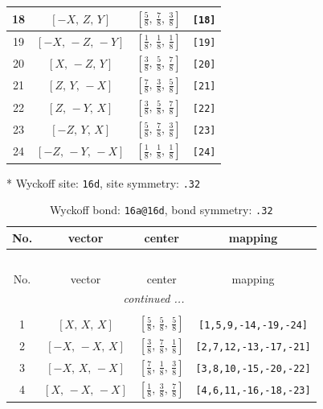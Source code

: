\documentclass[fleqn,8pt]{jsarticle}
\begin{document}
\begin{longtable}{cccc}
18 & $\left[ - X,\, Z,\, Y \right]$ & $\left[ \frac{5}{8},\, \frac{7}{8},\, \frac{3}{8} \right]$ & {\tt [18]} \\ \hline
19 & $\left[ - X,\, - Z,\, - Y \right]$ & $\left[ \frac{1}{8},\, \frac{1}{8},\, \frac{1}{8} \right]$ & {\tt [19]} \\ \hline
20 & $\left[ X,\, - Z,\, Y \right]$ & $\left[ \frac{3}{8},\, \frac{5}{8},\, \frac{7}{8} \right]$ & {\tt [20]} \\ \hline
21 & $\left[ Z,\, Y,\, - X \right]$ & $\left[ \frac{7}{8},\, \frac{3}{8},\, \frac{5}{8} \right]$ & {\tt [21]} \\ \hline
22 & $\left[ Z,\, - Y,\, X \right]$ & $\left[ \frac{3}{8},\, \frac{5}{8},\, \frac{7}{8} \right]$ & {\tt [22]} \\ \hline
23 & $\left[ - Z,\, Y,\, X \right]$ & $\left[ \frac{5}{8},\, \frac{7}{8},\, \frac{3}{8} \right]$ & {\tt [23]} \\ \hline
24 & $\left[ - Z,\, - Y,\, - X \right]$ & $\left[ \frac{1}{8},\, \frac{1}{8},\, \frac{1}{8} \right]$ & {\tt [24]} \\
\end{longtable}
* Wyckoff site: {\tt 16d}, site symmetry: {\tt .32}
\renewcommand{\arraystretch}{1.2}
\begin{longtable}{cccc}
\caption{Wyckoff bond: {\tt 16a@16d}, bond symmetry: {\tt .32}}
 \\
 \hline \hline
No. & vector & center & mapping \\ \hline \endfirsthead

\multicolumn{3}{l}{\tablename\ \thetable{}} \\
 \hline \hline
No. & vector & center & mapping \\ \hline \endhead

 \hline \hline
\multicolumn{3}{r}{\footnotesize\it continued ...} \\ \endfoot

 \hline \hline
\multicolumn{3}{r}{} \\ \endlastfoot

1 & $\left[ X,\, X,\, X \right]$ & $\left[ \frac{5}{8},\, \frac{5}{8},\, \frac{5}{8} \right]$ & {\tt [1,5,9,-14,-19,-24]} \\ \hline
2 & $\left[ - X,\, - X,\, X \right]$ & $\left[ \frac{3}{8},\, \frac{7}{8},\, \frac{1}{8} \right]$ & {\tt [2,7,12,-13,-17,-21]} \\ \hline
3 & $\left[ - X,\, X,\, - X \right]$ & $\left[ \frac{7}{8},\, \frac{1}{8},\, \frac{3}{8} \right]$ & {\tt [3,8,10,-15,-20,-22]} \\ \hline
4 & $\left[ X,\, - X,\, - X \right]$ & $\left[ \frac{1}{8},\, \frac{3}{8},\, \frac{7}{8} \right]$ & {\tt [4,6,11,-16,-18,-23]} \\
\end{longtable}
\end{document}
